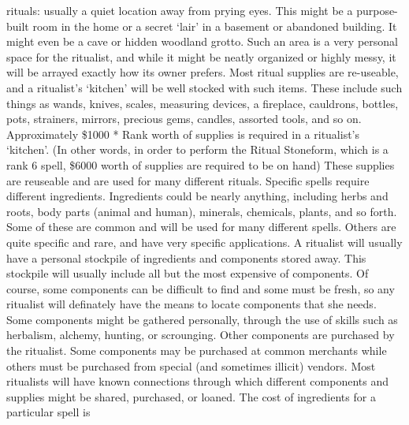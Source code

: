 \documentclass[twoside]{book}
\begin{document}
               rituals: usually a quiet location away from prying eyes.
               This might be a purpose-built room in the home or a secret
               `lair' in a basement or abandoned building. It
               might even be a cave or hidden woodland grotto. Such an
               area is a very personal space for the ritualist, and while
               it might be neatly organized or highly messy, it will be
               arrayed exactly how its owner prefers.   Most ritual supplies are re-useable, and a
               ritualist's `kitchen' will be well
               stocked with such items. These include such things as
               wands, knives, scales, measuring devices, a fireplace,
               cauldrons, bottles, pots, strainers, mirrors, precious
               gems, candles, assorted tools, and so on. Approximately
               \$1000 * Rank worth of supplies is required in a
               ritualist's `kitchen'. (In other words,
               in order to perform the Ritual Stoneform, which is a rank
               6 spell, \$6000 worth of supplies are required to be on
               hand) These supplies are reuseable and are used for many
               different rituals.   Specific spells require different ingredients.
               Ingredients could be nearly anything, including herbs and
               roots, body parts (animal and human), minerals, chemicals,
               plants, and so forth. Some of these are common and will be
               used for many different spells. Others are quite specific
               and rare, and have very specific applications. A ritualist
               will usually have a personal stockpile of ingredients and
               components stored away. This stockpile will usually
               include all but the most expensive of components. Of
               course, some components can be difficult to find and some
               must be fresh, so any ritualist will definately have the
               means to locate components that she needs. Some components
               might be gathered personally, through the use of skills
               such as herbalism, alchemy, hunting, or scrounging. Other
               components are purchased by the ritualist. Some components
               may be purchased at common merchants while others must be
               purchased from special (and sometimes illicit) vendors.
               Most ritualists will have known connections through which
               different components and supplies might be shared,
               purchased, or loaned.   The cost of ingredients for a particular spell is
\end{document}
